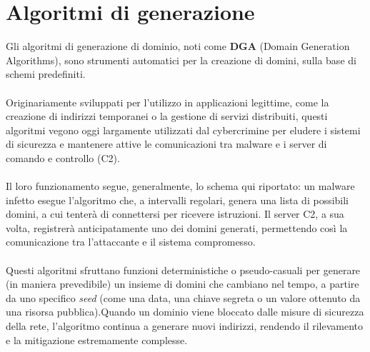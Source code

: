 
\section*{Algoritmi di generazione}
Gli algoritmi di generazione di dominio, noti come \textbf{DGA} (Domain Generation Algorithms), 
sono strumenti automatici per la creazione di domini, sulla base di schemi predefiniti.  
\\\\
Originariamente sviluppati per l'utilizzo in applicazioni legittime, 
come la creazione di indirizzi temporanei o la gestione di servizi distribuiti, 
questi algoritmi vegono oggi largamente utilizzati dal cybercrimine per
eludere i sistemi di sicurezza e mantenere attive le comunicazioni tra 
malware e i server di comando e controllo (C2). 
\\\\
Il loro funzionamento segue, generalmente, lo schema qui riportato: un malware
infetto esegue l'algoritmo che, a intervalli regolari, genera una 
lista di possibili domini, a cui tenterà di connettersi per ricevere istruzioni. 
Il server C2, a sua volta, registrerà anticipatamente uno dei domini generati, 
permettendo così la comunicazione tra l'attaccante e il sistema compromesso. 
\\\\
Questi algoritmi sfruttano funzioni deterministiche o pseudo-casuali 
per generare (in maniera prevedibile) un insieme di domini che cambiano
nel tempo, a partire da uno specifico \textit{seed} (come una data, una chiave segreta o un valore 
ottenuto da una risorsa pubblica).Quando un dominio viene bloccato 
dalle misure di sicurezza della rete, l'algoritmo continua a generare 
nuovi indirizzi, rendendo il rilevamento e la mitigazione estremamente 
complesse.

